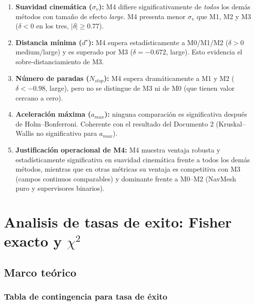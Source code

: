 \documentclass[12pt,a4paper,oneside]{book}
\begin{document}
\begin{enumerate}[leftmargin=*]
    \item \textbf{Suavidad cinemática ($\sigma_v$):} M4 difiere significativamente de \emph{todos} los demás métodos con tamaño de efecto \emph{large}. M4 presenta menor $\sigma_v$ que M1, M2 y M3 ($\delta < 0$ en los tres, $|\delta| \geq 0.77$).
    
    \item \textbf{Distancia mínima ($d^\star$):} M4 supera estadísticamente a M0/M1/M2 ($\delta > 0$ medium/large) y es superado por M3 ($\delta = -0.672$, large). Esto evidencia el sobre-distanciamiento de M3.
    
    \item \textbf{Número de paradas ($N_{stop}$):} M4 supera dramáticamente a M1 y M2 ($\delta < -0.98$, large), pero no se distingue de M3 ni de M0 (que tienen valor cercano a cero).
    
    \item \textbf{Aceleración máxima ($a_{max}$):} ninguna comparación es significativa después de Holm--Bonferroni. Coherente con el resultado del Documento 2 (Kruskal--Wallis no significativo para $a_{max}$).
    
    \item \textbf{Justificación operacional de M4:} M4 muestra ventaja robusta y estadísticamente significativa en suavidad cinemática frente a todos los demás métodos, mientras que en otras métricas su ventaja es competitiva con M3 (campos continuos comparables) y dominante frente a M0--M2 (NavMesh puro y supervisores binarios).
\end{enumerate}



\chapter{Analisis de tasas de exito: Fisher exacto y $\chi^2$}
\label{chap:fisher}




\section{Marco teórico}

\subsection{Tabla de contingencia para tasa de éxito}
\end{document}
